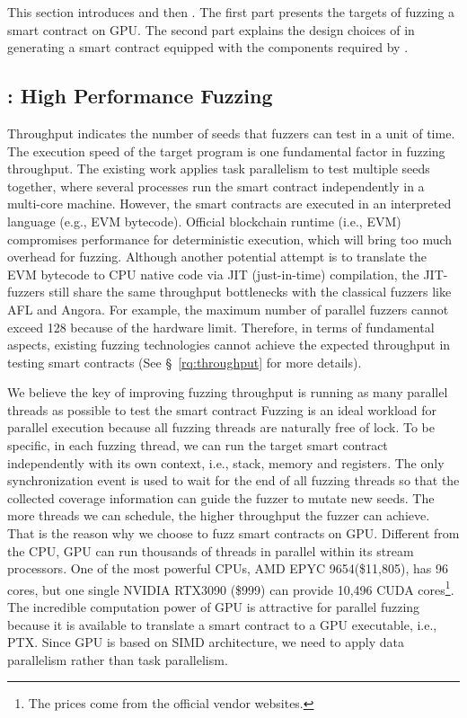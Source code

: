 This section introduces {\runner} and then {\translator}.
The first part presents the targets of fuzzing a smart contract on GPU.
The second part explains the design choices of {\translator} in generating a smart contract equipped with the components required by {\runner}.


\subsection{{\runner}: High Performance Fuzzing}
Throughput indicates the number of seeds that fuzzers can test in a unit of time.
%
The execution speed of the target program is one fundamental factor in fuzzing throughput\cite{fuzzan_atc}. 
%
The existing work\cite{confuzzius_eurosp,echidna_issta} applies task parallelism to test multiple seeds together, where several processes run the smart contract independently in a multi-core machine.
%
However, the smart contracts are executed in an interpreted language (e.g., EVM bytecode\cite{wood2014ethereum}).
Official blockchain runtime (i.e., EVM) compromises performance for deterministic execution, which will bring too much overhead for fuzzing.
%
Although another potential attempt is to translate the EVM bytecode to CPU native code via JIT (just-in-time) compilation\cite{jit1998survey}, the JIT-fuzzers still share the same throughput bottlenecks with the classical fuzzers like AFL\cite{afl} and Angora\cite{angora_sp}. 
For example, the maximum number of parallel fuzzers cannot exceed 128 because of the hardware limit.
%
%
Therefore, in terms of fundamental aspects, existing fuzzing technologies cannot achieve the expected throughput in testing smart contracts (See \S~\ref{rq:throughput} for more details).


We believe the key of improving fuzzing throughput is running as many parallel threads as possible to test the smart contract 
%
Fuzzing is an ideal workload for parallel execution because all fuzzing threads are naturally free of lock.
To be specific, in each fuzzing thread, we can run the target smart contract independently with its own context, i.e., stack, memory and registers. 
The only synchronization event is used to wait for the end of all fuzzing threads so that the collected coverage information can guide the fuzzer to mutate new seeds.
%
The more threads we can schedule, the higher throughput the fuzzer can achieve.
That is the reason why we choose to fuzz smart contracts on GPU. 
Different from the CPU, GPU can run thousands of threads in parallel within its stream processors. 
%
One of the most powerful CPUs, AMD EPYC 9654(\$11,805), has 96 cores, but one single NVIDIA RTX3090 (\$999) can provide 10,496 CUDA cores\footnote{The prices come from the official vendor websites.}. 
The incredible computation power of GPU is attractive for parallel fuzzing because it is available to translate a smart contract to a GPU executable, i.e., PTX\cite{ptx2021doc}. 
%
Since GPU is based on SIMD architecture, we need to apply data parallelism rather than task parallelism.
%


